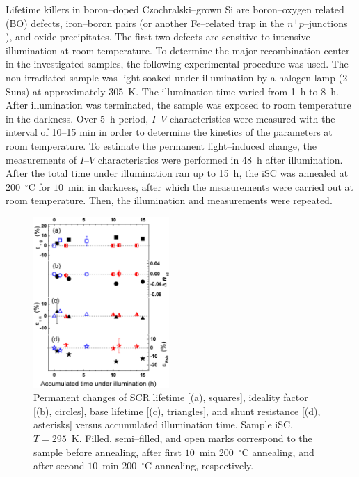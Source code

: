 \documentclass[aip,jap, amsmath,amssymb,reprint]{revtex4-1}
\begin{document}
Lifetime killers  in boron--doped Czochralski--grown Si are boron--oxygen related (BO) defects,\cite{LIDRev,LIDRev2}
iron--boron pairs \cite{MurphyJAP2011,FeB:Vahanissi,FeB:Schmidt} (or another Fe--related trap in the $n^+p$--junctions \cite{TeimurazPSS,TeimurazJAP}),
and oxide precipitates.\cite{MurphySC2014,Oxide_Schon,MurphyJAP2011,MurphyJAP2012,Oxide:Chen,Oxide:Porrini}
The first two defects are sensitive to intensive illumination at room temperature.
To determine the major recombination center in the investigated samples, the following experimental procedure was used.
The non-irradiated sample was light soaked under illumination by a halogen lamp (2 Suns) at approximately 305~K.
The illumination time varied from 1~h to 8~h.
After illumination was terminated, the sample was exposed to room temperature in the darkness.
Over 5~h period, $I$--$V$ characteristics were measured with the interval of 10--15 min in order to determine the kinetics of the parameters at room temperature.
To estimate the permanent light--induced change, the measurements of  $I$--$V$ characteristics were performed in 48~h after illumination.
After the total time under illumination ran up to 15~h, the iSC was annealed at 200~$^\circ$C for $10$~min in darkness,  after which the measurements were carried out at room temperature.
Then, the illumination and measurements were repeated.


\begin{figure}
\includegraphics[width=0.46\textwidth]{fig_10}%
\caption{\label{fig_Illum}
Permanent changes of SCR lifetime [(a), squares], ideality factor [(b), circles], base lifetime [(c), triangles], and shunt resistance [(d), asterisks] versus accumulated illumination time.
Sample iSC, $T=295$~K.
Filled, semi--filled, and open marks correspond to the sample before annealing, after first $10$~min 200~$^\circ$C annealing, and after second $10$~min 200~$^\circ$C annealing, respectively.
}%
\end{figure}
\end{document}
